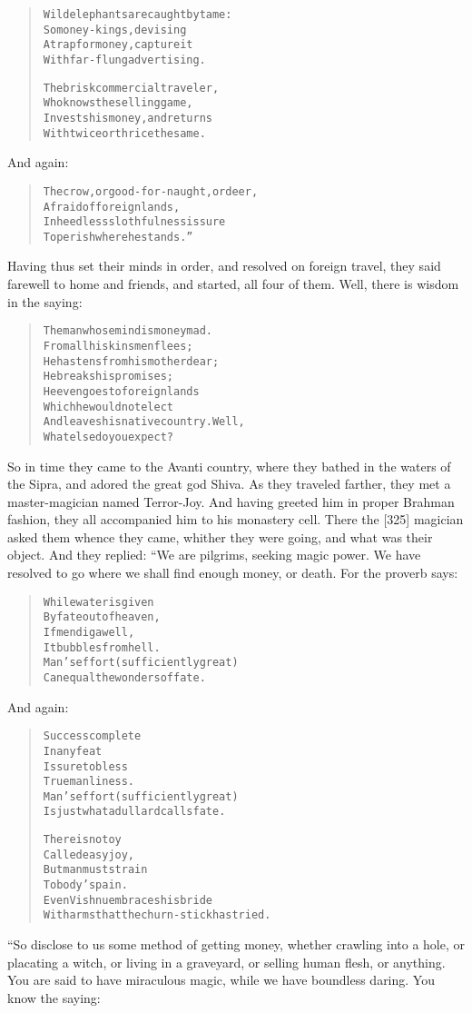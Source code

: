 \documentclass[article, twoside, 14pt]{memoir}
\renewenvironment{verbatim}{%
\begin{quote}%
\vskip -10pt%
\begin{alltt}\normalfont\large}{\end{alltt}%
\end{quote}%
\vskip -10pt
} %
\begin{document}
\begin{verbatim}
Wild elephants are caught by tame:
    So money-kings, devising
A trap for money, capture it
    With far-flung advertising.

The brisk commercial traveler,
    Who knows the selling game,
Invests his money, and returns
    With twice or thrice the same.
\end{verbatim}
And again:

\begin{verbatim}
The crow, or good-for-naught, or deer,
    Afraid of foreign lands,
In heedless slothfulness is sure
    To perish where he stands.”
\end{verbatim}
Having thus set their minds in order, and resolved on foreign
travel, they said farewell to home and friends, and started, all
four of them. Well, there is wisdom in the saying:

\begin{verbatim}
The man whose mind is money mad.
    From all his kinsmen flees;
He hastens from his mother dear;
    He breaks his promises;
He even goes to foreign lands
    Which he would not elect
And leaves his native country. Well,
    What else do you expect?
\end{verbatim}
So in time they came to the Avanti country, where they bathed in
the waters of the Sipra, and adored the great god Shiva. As they
traveled farther, they met a master-magician named Terror-Joy. And
having greeted him in proper Brahman fashion, they all accompanied
him to his monastery cell. There the [325] magician asked them
whence they came, whither they were going, and what was their
object. And they replied: “We are pilgrims, seeking magic power. We
have resolved to go where we shall find enough money, or death. For
the proverb says:

\begin{verbatim}
While water is given
By fate out of heaven,
If men dig a well,
It bubbles from hell.
Man's effort (sufficiently great)
Can equal the wonders of fate.
\end{verbatim}
And again:

\begin{verbatim}
Success complete
In any feat
Is sure to bless
True manliness.
Man's effort (sufficiently great)
Is just what a dullard calls fate.

There is no toy
Called easy joy,
But man must strain
To body's pain.
Even Vishnu embraces his bride
With arms that the churn-stick has tried.
\end{verbatim}
“So disclose to us some method of getting money, whether crawling
into a hole, or placating a witch, or living in a graveyard, or
selling human flesh, or anything. You are said to have miraculous
magic, while we have boundless daring. You know the saying:
\end{document}
